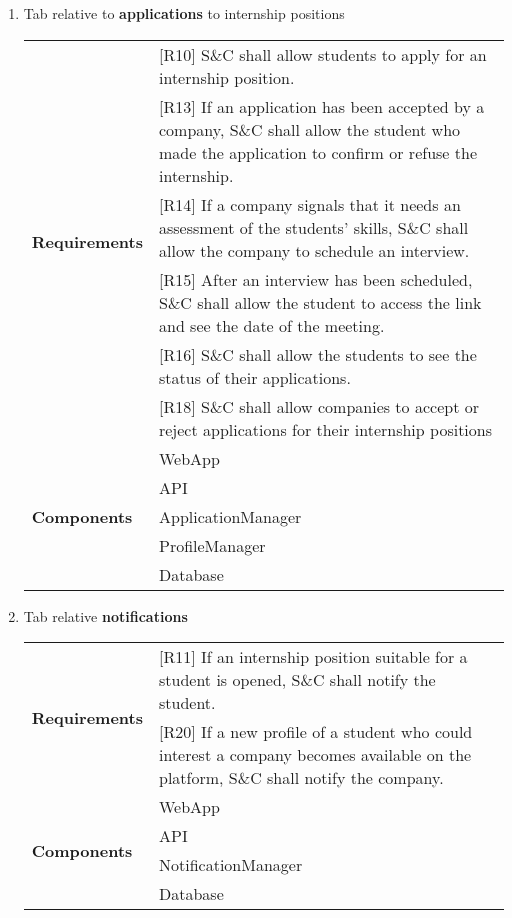 \begin{enumerate}
    \newpage
    \item Tab relative to \textbf{applications} to internship positions
    \begin{center}
        \begin{tabular}{ |p{4cm}|p{10cm}| } 
        \hline
        \multirow{6}{6em}{\textbf{Requirements}} 
        & [R10] S\&C shall allow students to apply for an internship position. \\
        & [R13]  If an application has been accepted by a company, S\&C shall allow the student who made the application to confirm or refuse the internship. \\
        & [R14] If a company signals that it needs an assessment of the students’ skills, S\&C shall allow the company to schedule an interview. \\
        & [R15] After an interview has been scheduled, S\&C shall allow the student to access the link and see the date of the meeting. \\
        & [R16] S\&C shall allow the students to see the status of their applications. \\
        & [R18] S\&C shall allow companies to accept or reject applications for their internship positions \\
        \hline
        \multirow{5}{6em}{\textbf{Components}} 
        & WebApp \\ 
        & API \\ 
        & ApplicationManager \\ 
        & ProfileManager \\
        & Database \\
        \hline
        \end{tabular}
    \end{center}
    
    \item Tab relative \textbf{notifications}
    \begin{center}
        \begin{tabular}{ |p{4cm}|p{10cm}| } 
        \hline
        \multirow{2}{6em}{\textbf{Requirements}} 
        & [R11] If an internship position suitable for a student is opened, S\&C shall notify the student. \\
        & [R20]  If a new profile of a student who could interest a company becomes available on the platform, S\&C
        shall notify the company. \\
        \hline
        \multirow{4}{6em}{\textbf{Components}} 
        & WebApp \\ 
        & API \\ 
        & NotificationManager \\ 
        & Database \\
        \hline
        \end{tabular}
    \end{center}
    

\end{enumerate}
